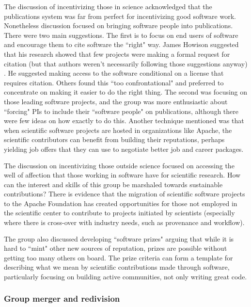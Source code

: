 \documentclass[11pt, oneside]{amsart}
\begin{document}
The discussion of incentivizing those in science acknowledged that the
publications system was far from perfect for incentivizing good software work.
Nonetheless discussion focused on bringing software people into publications.
There were two main suggestions. The first is to focus on end users of software
and encourage them to cite software the ``right" way. James Howison suggested
that his research showed that few projects were making a formal request for
citation (but that authors weren't necessarily following those suggestions
anyway) \cite{howison2015jasist}. He suggested making access to the software
conditional on a license that requires citation. Others found this ``too
confrontational" and preferred to concentrate on making it easier to do the
right thing. The second was focusing on those leading software projects, and the
group was more enthusiastic about ``forcing" PIs to include their ``software
people" on publications, although there were few ideas on how exactly to do
this. Another technique mentioned was that when scientific software projects are
hosted in organizations like Apache, the scientific contributors can benefit
from building their reputations, perhaps yielding job offers that they can use
to negotiate better job and career packages.

The discussion on incentivizing those outside science focused on accessing the
well of affection that those working in software have for scientific research.
How can the interest and skills of this group be marshaled towards sustainable
contributions? There is evidence that the migration of scientific software
projects to the Apache Foundation has created opportunities for those not
employed in the scientific center to contribute to projects initiated by
scientists (especially where there is cross-over with industry needs, such as
provenance and workflow).

The group also discussed developing ``software prizes" arguing that while it is
hard to ``mint" other new sources of reputation, prizes are possible without
getting too many others on board. The prize criteria can form a template for
describing what we mean by scientific contributions made through software,
particularly focusing on building active communities, not only writing great
code.

\subsubsection{Group merger and redivision}
\end{document}

